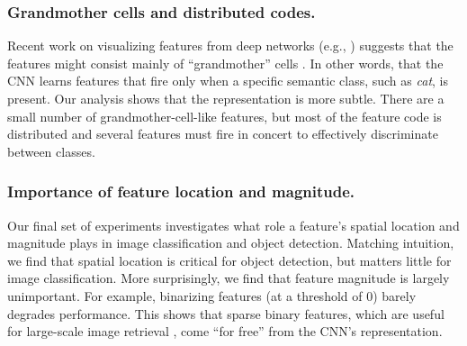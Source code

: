 \subsubsection{Grandmother cells and distributed codes.}
Recent work on visualizing features from deep networks (e.g., \cite{GoogleCat,DeConv}) suggests that the features might consist mainly of ``grandmother'' cells \cite{Barlow,Grandmother}.
In other words, that the CNN learns features that fire only when a specific semantic class, such as \emph{cat}, is present.
Our analysis shows that the representation is more subtle.
There are a small number of grandmother-cell-like features, but most of the feature code is distributed and several features must fire in concert to effectively discriminate between classes.

\subsubsection{Importance of feature location and magnitude.}
Our final set of experiments investigates what role a feature's spatial location and magnitude plays in image classification and object detection.
Matching intuition, we find that spatial location is critical for object detection, but matters little for image classification.
More surprisingly, we find that feature magnitude is largely unimportant.
For example, binarizing features (at a threshold of 0) barely degrades performance.
This shows that sparse binary features, which are useful for large-scale image retrieval \cite{gong2011iterative,weiss2009spectral}, come ``for free'' from the CNN's representation.


